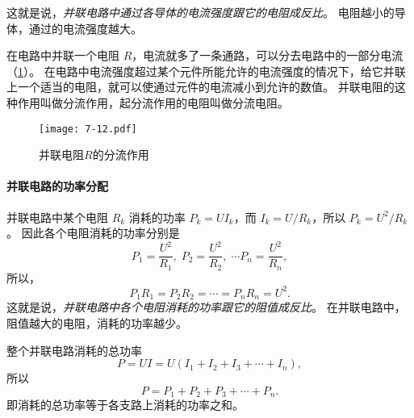 这就是说，\emph{并联电路中通过各导体的电流强度跟它的电阻成反比}。
电阻越小的导体，通过的电流强度越大。

在电路中并联一个电阻 $R$，电流就多了一条通路，可以分去电路中的一部分电流（\cref{fig:7-12}）。
在电路中电流强度超过某个元件所能允许的电流强度的情况下，给它并联上一个适当的电阻，就可以使通过元件的电流减小到允许的数值。
并联电阻的这种作用叫做分流作用，起分流作用的电阻叫做分流电阻。
\begin{figure}
  \texttt{[image: 7-12.pdf]}
  \caption{并联电阻$R$的分流作用}\label{fig:7-12}
\end{figure}	

\paragraph{并联电路的功率分配} 并联电路中某个电阻 $R_k$ 消耗的功率 $P_k=UI_k$，而 $I_k=U/R_k$，所以 $P_k=U^2/R_k$。
因此各个电阻消耗的功率分别是
\[ P_1=\frac{U^2}{R_1},\;  P_2=\frac{U^2}{R_2},\; \cdots  P_n=\frac{U^2}{R_n},\]
所以，
\[P_1R_1=P_2R_2=\cdots=P_nR_n=U^2.\]
这就是说，\emph{并联电路中各个电阻消耗的功率跟它的阻值成反比}。
在并联电路中，阻值越大的电阻，消耗的功率越少。

整个并联电路消耗的总功率
\[P=UI=U (I_1+I_2+I_3+\cdots+I_n),\]
所以
\[P=P_1+P_2+P_3+\cdots+P_n.\]
即消耗的总功率等于各支路上消耗的功率之和。

